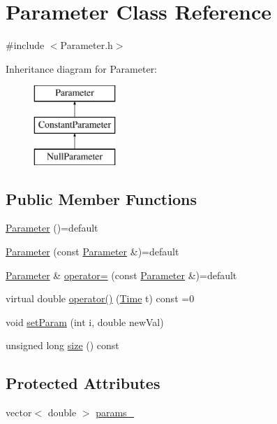 \hypertarget{class_parameter}{}\section{Parameter Class Reference}
\label{class_parameter}


{\ttfamily \#include $<$Parameter.\+h$>$}

Inheritance diagram for Parameter\+:\begin{figure}[H]
\begin{center}
\leavevmode
\includegraphics[height=3.000000cm]{class_parameter}
\end{center}
\end{figure}
\subsection*{Public Member Functions}
\begin{DoxyCompactItemize}
\item 
\hyperlink{class_parameter_a5de1d76f6b0342f3e98d004733ce9c2c}{Parameter} ()=default
\item 
\hyperlink{class_parameter_a07b46a4af924cbaea806505343d7b83a}{Parameter} (const \hyperlink{class_parameter}{Parameter} \&)=default
\item 
\hyperlink{class_parameter}{Parameter} \& \hyperlink{class_parameter_ac7e34f069ed1474901fce2f06e0ee54f}{operator=} (const \hyperlink{class_parameter}{Parameter} \&)=default
\item 
virtual double \hyperlink{class_parameter_ae6317fac3d0b5e69101eb7059d151ca7}{operator()} (\hyperlink{_name_def_8h_ac2d3e0ba793497bcca555c7c2cf64ff3}{Time} t) const =0
\item 
void \hyperlink{class_parameter_a8cebb26e89537b098c8b42ef9aeb0f66}{set\+Param} (int i, double new\+Val)
\item 
unsigned long \hyperlink{class_parameter_ae1ca6e3ab5f2d2ed3bffbdee6e941068}{size} () const
\end{DoxyCompactItemize}
\subsection*{Protected Attributes}
\begin{DoxyCompactItemize}
\item 
vector$<$ double $>$ \hyperlink{class_parameter_ab7e9f6b7b261380449ff0eca797e48e7}{params\+\_\+}
\end{DoxyCompactItemize}


